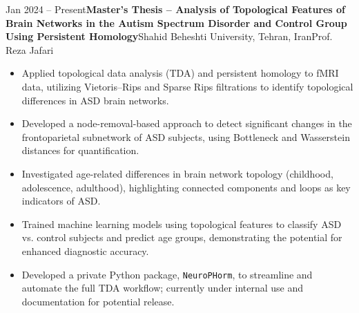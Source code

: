\documentclass[12pt, b4paper]{cv}
\begin{document}
\begin{research_exp}{Jan 2024 -- Present}{\textbf{Master’s Thesis – Analysis of Topological Features of Brain Networks in the Autism Spectrum Disorder and Control Group Using Persistent Homology}\vspace{5pt}}{Shahid Beheshti University, Tehran, Iran}{Prof. Reza Jafari}

\vspace{10pt}
\begin{itemize}
	\item Applied topological data analysis (TDA) and persistent homology to fMRI data, utilizing Vietoris–Rips and Sparse Rips filtrations to identify topological differences in ASD brain networks.

	\item Developed a node-removal-based approach to detect significant changes in the frontoparietal subnetwork of ASD subjects, using Bottleneck and Wasserstein distances for quantification.
	
	\item Investigated age-related differences in brain network topology (childhood, adolescence, adulthood), highlighting connected components and loops as key indicators of ASD.
	
	\item Trained machine learning models using topological features to classify ASD vs. control subjects and predict age groups, demonstrating the potential for enhanced diagnostic accuracy.
	
	\item Developed a private Python package, \texttt{NeuroPHorm}, to streamline and automate the full TDA workflow; currently under internal use and documentation for potential release.
\end{itemize}
\end{research_exp}



\end{document}
